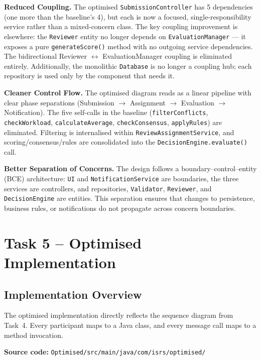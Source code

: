 \documentclass[12pt, a4paper]{article}
\begin{document}
\textbf{Reduced Coupling.}
The optimised \texttt{SubmissionController} has 5 dependencies (one more than the baseline's 4), but each is now a focused, single-responsibility service rather than a mixed-concern class. The key coupling improvement is elsewhere: the \texttt{Reviewer} entity no longer depends on \texttt{EvaluationManager} --- it exposes a pure \texttt{generateScore()} method with no outgoing service dependencies. The bidirectional Reviewer $\leftrightarrow$ EvaluationManager coupling is eliminated entirely. Additionally, the monolithic \texttt{Database} is no longer a coupling hub; each repository is used only by the component that needs it.

\textbf{Cleaner Control Flow.}
The optimised diagram reads as a linear pipeline with clear phase separations (Submission $\rightarrow$ Assignment $\rightarrow$ Evaluation $\rightarrow$ Notification). The five self-calls in the baseline (\texttt{filterConflicts}, \texttt{checkWorkload}, \texttt{calculateAverage}, \texttt{checkConsensus}, \texttt{applyRules}) are eliminated. Filtering is internalised within \texttt{ReviewAssignmentService}, and scoring/consensus/rules are consolidated into the \texttt{DecisionEngine.evaluate()} call.

\textbf{Better Separation of Concerns.}
The design follows a boundary--control--entity (BCE) architecture: \texttt{UI} and \texttt{NotificationService} are boundaries, the three services are controllers, and repositories, \texttt{Validator}, \texttt{Reviewer}, and \texttt{DecisionEngine} are entities. This separation ensures that changes to persistence, business rules, or notifications do not propagate across concern boundaries.

\section{Task 5 -- Optimised Implementation}
\label{sec:task5}

\subsection{Implementation Overview}

The optimised implementation directly reflects the sequence diagram from Task~4. Every participant maps to a Java class, and every message call maps to a method invocation.

\textbf{Source code:} \texttt{Optimised/src/main/java/com/isrs/optimised/}
\end{document}

